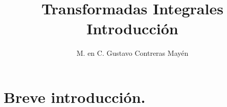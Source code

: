 
\title{Transformadas Integrales \\ \large{Introducción}} \vspace{-3ex}
\author{M. en C. Gustavo Contreras Mayén}
\date{ }
\newcommand{\Cancel}[2][black]{{\color{#1}\cancel{\color{black}#2}}}

\vspace{-4cm}
\maketitle
\fontsize{14}{14}\selectfont
\tableofcontents
\newpage

\section{Breve introducción.}

